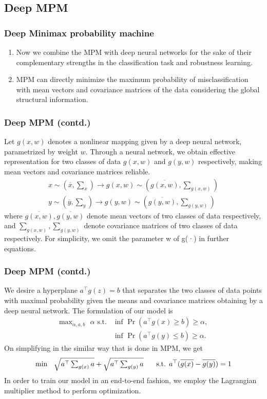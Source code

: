 \documentclass{beamer}
\providecommand{\pr}[1]{\ensuremath{\Pr\left(#1\right)}}
\begin{document}
\subsection*{Deep MPM}
\begin{frame}[fragile]
\frametitle{Deep Minimax probability machine}
\begin{enumerate}
    \item Now we combine the MPM with deep neural networks for the sake of their complementary strengths in the classification task and robustness learning.
    \item MPM can directly minimize the maximum probability
of misclassification with mean vectors and covariance matrices
of the data considering the global structural information.
\end{enumerate}

\end{frame}
\begin{frame}[fragile]
\frametitle{Deep MPM (contd.)}
Let $g(x,w)$ denotes a nonlinear mapping given by a deep
neural network, parametrized by weight $w$. Through a neural network, we obtain effective representation for two classes of data $g(x,w)$ and $g(y,w)$ respectively, making mean vectors and covariance matrices reliable.
\begin{align}
    x \sim (\overline{x},\textstyle \sum_x)\rightarrow  g(x,w) \sim \left(\overline{g(x,w)},\textstyle \sum_{g(x,w)}\right)\\
    y \sim (\overline{y},\textstyle \sum_y)\rightarrow  g(y,w) \sim \left(\overline{g(y,w)},\textstyle \sum_{g(y,w)}\right)
\end{align}
 where $\overline{g(x,w)},\overline{g(y,w)}$ denote mean vectors of two classes of data respectively, and $\sum_{g(x,w)}, \sum_{g(y,w)}$ denote covariance matrices of two classes of data respectively. For simplicity, we omit the parameter w of g(·) in further equations.
\end{frame}
\begin{frame}[fragile]
\frametitle{Deep MPM (contd.)}
We desire a hyperplane $a^{\top}g(z) = b$ that separates the
two classes of data points with maximal probability given the
means and covariance matrices obtaining by a deep neural
network. The formulation of our model is 
\begin{align}
    \text{max}_{\alpha,a,b} \text{ $\alpha$} \text{ s.t.}&\text{ inf } \pr{a^{\top} g(x)\geq b } \geq \alpha,\label{eq1}\\
    &\text{ inf } \pr{a^{\top} g(y) \leq b } \geq \alpha. \nonumber
\end{align}
On simplifying in the similar way that is done in MPM, we get
\begin{align}
    \text{min  }\hspace{.2cm} \sqrt{a^{\top}\textstyle \sum_{g(x)} a}+\sqrt{a^{\top}\textstyle \sum_{g(y)} a} \hspace{.5cm} \text{ s.t. } a^{\top}(\overline{g(x)}-\overline{g(y)})=1
\end{align}
In order to train our model in an end-to-end fashion, we
employ the Lagrangian multiplier method to perform optimization.

\end{frame}
\end{document}
